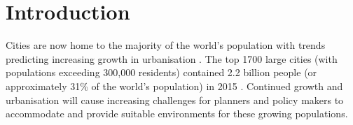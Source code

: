 \documentclass[10pt,letterpaper,hidelinks]{article}
\begin{document}



\linenumbers



\section*{Introduction}\label{sec:introduction}

Cities are now home to the majority of the world's population with trends predicting increasing growth in urbanisation \cite{UNDESA2015,WHO2016,ABS2008}. The top 1700 large cities (with populations exceeding 300,000 residents) contained 2.2 billion people (or approximately 31\% of the world's population) in 2015 \cite{UN2014}. Continued growth and urbanisation will cause increasing challenges for planners and policy makers to accommodate and provide suitable environments for these growing populations.
\end{document}
